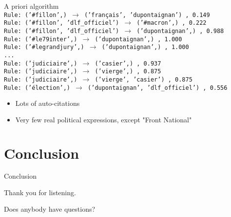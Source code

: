 \documentclass{beamer}
\begin{document}
\begin{frame}{A priori algorithm}
\begingroup
\fontsize{9pt}{12pt}
\texttt{\\
Rule: ('\#fillon',) $\to$ ('français', 'dupontaignan') , 0.149\\
Rule: ('\#fillon', 'dlf\_officiel') $\to$ ('\#macron',) , 0.222\\
Rule: ('\#fillon', 'dlf\_officiel') $\to$ ('dupontaignan',) , 0.988\\
Rule: ('\#le79inter',) $\to$ ('dupontaignan',) , 1.000\\
Rule: ('\#legrandjury',) $\to$ ('dupontaignan',) , 1.000\\
...\\
Rule: ('judiciaire',) $\to$ ('casier',) , 0.937\\
Rule: ('judiciaire',) $\to$ ('vierge',) , 0.875\\
Rule: ('judiciaire',) $\to$ ('vierge', 'casier') , 0.875\\
Rule: ('élection',) $\to$ ('dupontaignan', 'dlf\_officiel') , 0.556\\
}
\endgroup


\begin{itemize}
\item Lots of auto-citations
\item Very few real political expressions, except "Front National"
\end{itemize}
\end{frame}


\section{Conclusion}
\begin{frame}{Conclusion}
\begin{center}
Thank you for listening. 
\bigskip


Does anybody have questions?
\end{center}
\end{frame}
 
\end{document}
